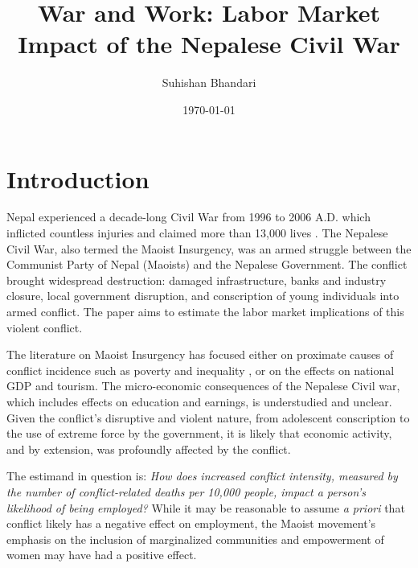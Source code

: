 \documentclass[12pt,a4paper]{article}
\begin{document}
	
\title{War and Work: Labor Market Impact of the Nepalese Civil War}

\author{Suhishan Bhandari}

\date{\today}

\maketitle
	
\begin{abstract}
	
\end{abstract}
	
	

\section{Introduction}
Nepal experienced a decade-long Civil War from 1996 to 2006 A.D. which inflicted countless injuries and claimed more than 13,000 lives \parencite{lawoti2009violent}. The Nepalese Civil War, also termed the Maoist Insurgency, was an armed struggle between the Communist Party of Nepal (Maoists) and the Nepalese Government. The conflict brought widespread destruction: damaged infrastructure, banks and industry closure, local government disruption, and conscription of young individuals into armed conflict. The paper aims to estimate the labor market implications of this violent conflict.

The literature on Maoist Insurgency has focused either on proximate causes of conflict incidence such as poverty and inequality \parencite{nepal2011more, do2010geography}, or on the effects on national GDP and tourism. The micro-economic consequences of the Nepalese Civil war, which includes effects on education and earnings, is understudied and unclear. Given the conflict's disruptive and violent nature, from adolescent conscription to the use of extreme force by the government, it is likely that economic activity, and by extension, was profoundly affected by the conflict.

The estimand in question is: \textit{How does increased conflict intensity, measured by the number of conflict-related deaths per 10,000 people, impact a person's likelihood of being employed?} While it may be reasonable to assume \textit{a priori} that conflict likely has a negative effect on employment, the Maoist movement's emphasis on the inclusion of marginalized communities and empowerment of women may have had a positive effect. 
\end{document}
